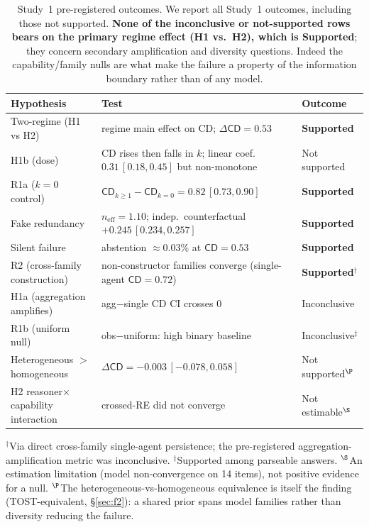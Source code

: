 \documentclass[acmsmall,screen,nonacm]{acmart}
\newcommand{\cd}{\textsf{CD}}
\newcommand{\neff}{\ensuremath{n_{\mathrm{eff}}}}
\begin{document}
\begin{table}[t]
\centering
\caption{Study~1 pre-registered outcomes. We report all Study~1 outcomes, including those not supported.
\textbf{None of the inconclusive or not-supported rows bears on the primary regime effect (H1 vs.\ H2),
which is Supported}; they concern secondary amplification and diversity questions. Indeed the
capability/family nulls are what make the failure a property of the information boundary rather than of any
model.}
\label{tab:outcomes}
\small
\begin{tabular}{p{3.4cm} p{4.6cm} l}
\toprule
Hypothesis & Test & Outcome \\
\midrule
Two-regime (H1 vs H2) & regime main effect on \cd{}; $\Delta\cd=0.53$ & \textbf{Supported} \\
H1b (dose) & \cd{} rises then falls in $k$; linear coef.\ $0.31\,[0.18,0.45]$ but non-monotone & Not supported \\
R1a ($k{=}0$ control) & $\cd_{k\ge1}-\cd_{k=0}=0.82\,[0.73,0.90]$ & \textbf{Supported} \\
Fake redundancy & $\neff=1.10$; indep.\ counterfactual $+0.245\,[0.234,0.257]$ & \textbf{Supported} \\
Silent failure & abstention $\approx\!0.03\%$ at $\cd=0.53$ & \textbf{Supported} \\
R2 (cross-family construction) & non-constructor families converge (single-agent $\cd=0.72$) & \textbf{Supported}$^\dagger$ \\
\midrule
H1a (aggregation amplifies) & agg$-$single \cd{} CI crosses 0 & Inconclusive \\
R1b (uniform null) & obs$-$uniform: high binary baseline & Inconclusive$^\ddagger$ \\
Heterogeneous $>$ homogeneous & $\Delta\cd=-0.003\,[-0.078,0.058]$ & Not supported$^\P$ \\
H2 reasoner$\times$capability interaction & crossed-RE did not converge & Not estimable$^\S$ \\
\bottomrule
\end{tabular}
\par\smallskip
\footnotesize $^\dagger$Via direct cross-family single-agent persistence; the pre-registered
aggregation-amplification metric was inconclusive. $^\ddagger$Supported among parseable
answers. $^\S$An estimation limitation (model non-convergence on 14 items), not positive evidence for a null.
$^\P$The heterogeneous-vs-homogeneous equivalence is itself the finding (TOST-equivalent, \S\ref{sec:f2}):
a shared prior spans model families rather than diversity reducing the failure.
\end{table}
\end{document}
